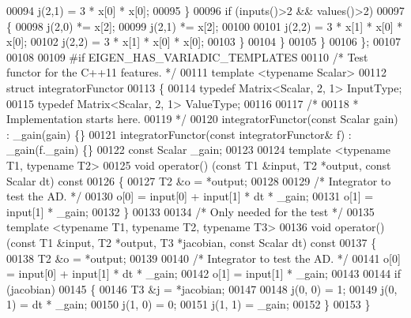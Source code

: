 \begin{DoxyCode}
00094         j(2,1) = 3 * x[0] * x[0];
00095       \}
00096       \textcolor{keywordflow}{if} (inputs()>2 && values()>2)
00097       \{
00098         j(2,0) *= x[2];
00099         j(2,1) *= x[2];
00100 
00101         j(2,2) = 3 * x[1] * x[0] * x[0];
00102         j(2,2) = 3 * x[1] * x[0] * x[0];
00103       \}
00104     \}
00105   \}
00106 \};
00107 
00108 
00109 \textcolor{preprocessor}{#if EIGEN\_HAS\_VARIADIC\_TEMPLATES}
00110 \textcolor{comment}{/* Test functor for the C++11 features. */}
00111 \textcolor{keyword}{template} <\textcolor{keyword}{typename} Scalar>
00112 \textcolor{keyword}{struct }integratorFunctor
00113 \{
00114     \textcolor{keyword}{typedef} Matrix<Scalar, 2, 1> InputType;
00115     \textcolor{keyword}{typedef} Matrix<Scalar, 2, 1> ValueType;
00116 
00117     \textcolor{comment}{/*}
00118 \textcolor{comment}{     * Implementation starts here.}
00119 \textcolor{comment}{     */}
00120     integratorFunctor(\textcolor{keyword}{const} Scalar gain) : \_gain(gain) \{\}
00121     integratorFunctor(\textcolor{keyword}{const} integratorFunctor& f) : \_gain(f.\_gain) \{\}
00122     \textcolor{keyword}{const} Scalar \_gain;
00123 
00124     \textcolor{keyword}{template} <\textcolor{keyword}{typename} T1, \textcolor{keyword}{typename} T2>
00125     \textcolor{keywordtype}{void} operator() (\textcolor{keyword}{const} T1 &input, T2 *output, \textcolor{keyword}{const} Scalar dt)\textcolor{keyword}{ const}
00126 \textcolor{keyword}{    }\{
00127         T2 &o = *output;
00128 
00129         \textcolor{comment}{/* Integrator to test the AD. */}
00130         o[0] = input[0] + input[1] * dt * \_gain;
00131         o[1] = input[1] * \_gain;
00132     \}
00133 
00134     \textcolor{comment}{/* Only needed for the test */}
00135     \textcolor{keyword}{template} <\textcolor{keyword}{typename} T1, \textcolor{keyword}{typename} T2, \textcolor{keyword}{typename} T3>
00136     \textcolor{keywordtype}{void} operator() (\textcolor{keyword}{const} T1 &input, T2 *output, T3 *jacobian, \textcolor{keyword}{const} Scalar dt)\textcolor{keyword}{ const}
00137 \textcolor{keyword}{    }\{
00138         T2 &o = *output;
00139 
00140         \textcolor{comment}{/* Integrator to test the AD. */}
00141         o[0] = input[0] + input[1] * dt * \_gain;
00142         o[1] = input[1] * \_gain;
00143 
00144         \textcolor{keywordflow}{if} (jacobian)
00145         \{
00146             T3 &j = *jacobian;
00147 
00148             j(0, 0) = 1;
00149             j(0, 1) = dt * \_gain;
00150             j(1, 0) = 0;
00151             j(1, 1) = \_gain;
00152         \}
00153     \}

\end{DoxyCode}
